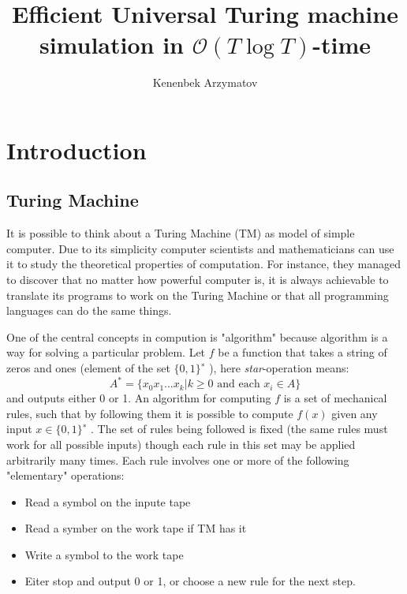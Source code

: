 \documentclass[a4paper,12pt]{article}
\title{Efficient Universal Turing machine simulation in $\mathcal{O}(T\log T)$-time\footnotemark}
\author{Kenenbek Arzymatov}
\begin{document}
\maketitle

\section{Introduction}
\subsection{Turing Machine}



\par 
It is possible to think about a Turing Machine (TM) as model of simple computer. Due to its simplicity computer scientists and mathematicians can use it to study the theoretical properties of computation. For instance, they managed to discover that no matter how powerful computer is, it is always achievable to translate its programs to work on the Turing Machine or that all programming languages can do the same things. 

\par
One of the central concepts in compution is "algorithm" because algorithm is a way for solving a particular problem.  
Let $f$ be a function that takes a string of zeros and ones (element of the set
$\{0, 1\}^{∗}$ ), here \textit{star}-operation means: 
$$A^* = \{x_0x_1\dots x_k | k \geq 0 \text{ and each }x_i \in A \}$$
 and outputs either 0 or 1. An algorithm for computing $f$ is a set of mechanical
rules, such that by following them it is possible to compute $f (x)$ given any input $x \in \{0, 1\}^{∗}$ . The
set of rules being followed is fixed (the same rules must work for all possible inputs)
though each rule in this set may be applied arbitrarily many times. Each rule involves
one or more of the following "elementary" operations: 

\begin{itemize}
\item Read a symbol on the inpute tape 
\item Read a symber on the work tape if TM has it 
\item Write a symbol to the work tape 
\item Eiter stop and output 0 or 1, or choose a new rule for the next step.
\end{itemize}
\end{document}
